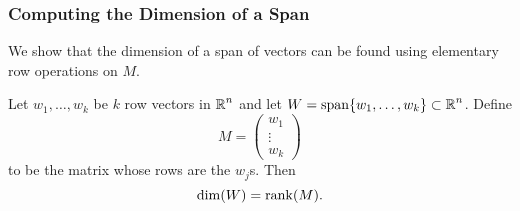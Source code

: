 \documentclass{ximera}
\begin{document}
\subsubsection*{Computing the Dimension of a Span} 

We show that the dimension of a span of vectors can be found using
elementary row operations on $M$. 

\begin{lemma}  \label{L:computerank}
Let $w_1,\ldots,w_k$ be $k$ row vectors in $\mbox{$\Bbb{R}$}^n$ and let
$W={\rm span}\{w_1,\ldots,w_k\}\subset\mbox{$\Bbb{R}$}^n$.  Define
\[
M =\left(\begin{array}{c} w_1\\ \vdots \\w_k \end{array}\right)
\]
to be the matrix whose rows are the $w_j$s.  Then
\begin{equation}  \label{e:dimW=rankM}
\dim(W) = {\rm rank}(M).
\end{equation}
\end{lemma}
\end{document}
